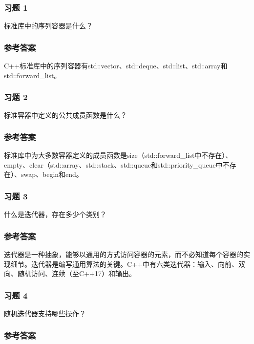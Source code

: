 \subsubsection{习题 1}

标准库中的序列容器是什么？

\subsubsection{参考答案}

C++标准库中的序列容器有std::vector、std::deque、std::list、std::array和std::forward\_list。


\subsubsection{习题 2}

标准容器中定义的公共成员函数是什么？

\subsubsection{参考答案}

标准库中为大多数容器定义的成员函数是size（std::forward\_list中不存在）、empty、clear（std::array、std::stack、std::queue和std::priority\_queue中不存在）、swap、begin和end。

\subsubsection{习题 3}

什么是迭代器，存在多少个类别？

\subsubsection{参考答案}

迭代器是一种抽象，能够以通用的方式访问容器的元素，而不必知道每个容器的实现细节。迭代器是编写通用算法的关键。C++中有六类迭代器：输入、向前、双向、随机访问、连续（至C++17）和输出。

\subsubsection{习题 4}

随机迭代器支持哪些操作？

\subsubsection{参考答案}

